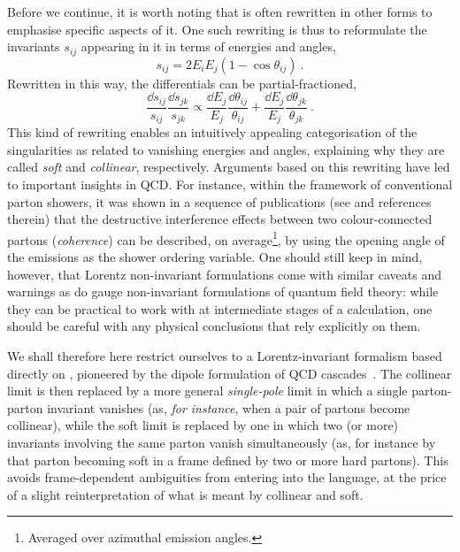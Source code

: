 Before we continue, it is worth noting that   is often
rewritten in other forms to emphasise specific aspects of it. 
One such rewriting is thus to reformulate the invariants
$s_{ij}$ appearing in it in terms of energies and angles, 
\begin{equation}
s_{ij} = 2 E_iE_j\left(1-\cos\theta_{ij}\right)~. 
\end{equation}
Rewritten in this way, the differentials can be partial-fractioned,
\begin{equation}
\frac{\dd{s_{ij}}}{s_{ij}}\frac{\dd{s_{jk}}}{s_{jk}} \propto
\frac{\dd{E_j}}{E_j}\frac{\dd{\theta_{ij}}}{\theta_{ij}} + 
\frac{\dd{E_j}}{E_j}\frac{\dd{\theta_{jk}}}{\theta_{jk}} ~. 
\end{equation}
This kind of rewriting 
enables an intuitively appealing categorisation of the singularities 
as related to vanishing energies and angles, explaining why they are 
called \emph{soft} and \emph{collinear}, respectively. Arguments based
on this rewriting have led to important insights in QCD.
For instance, within the framework of conventional parton showers,
it was shown in a sequence of publications (see 
\cite{Marchesini:1983bm,Marchesini:1987cf} and references therein) that 
the destructive interference effects between two 
colour-connected partons (\emph{coherence}) 
can be described, on average\footnote{Averaged over azimuthal emission angles.}, by using the opening angle of the emissions as the shower ordering variable.
One should still keep in mind, however,  
that Lorentz non-invariant formulations come with similar caveats and
warnings as do  gauge non-invariant formulations of quantum field
theory: while they can be practical to work with at 
intermediate stages of a calculation, one should be careful with
any physical conclusions that rely explicitly on them.

We shall therefore here restrict ourselves to a 
Lorentz-invariant formalism based directly on
, pioneered by the dipole formulation of QCD
cascades~\cite{Gustafson:1987rq}. 
The collinear limit is then replaced by a more
general \emph{single-pole} limit in which a single 
parton-parton invariant vanishes (as, \emph{for instance}, when 
a pair of partons become collinear),
while the soft limit is replaced by one in which two (or more) 
invariants involving the
same parton vanish simultaneously (as, for instance by that parton
becoming soft in a frame defined by two or more hard partons). This
avoids frame-dependent ambiguities from entering into the language,
at the price of a slight reinterpretation of what
is meant by collinear and soft. 

